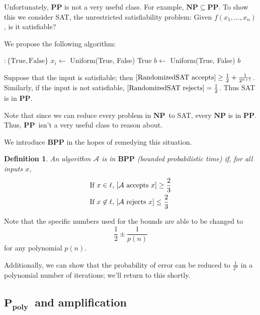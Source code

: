 \documentclass[11pt]{article}
\let\Pr\relax
\DeclareMathOperator*{\Pr}{\mathbb{P}}
\newcommand{\NP}{\ensuremath{\mathbf{NP}}}
\newcommand{\PP}{\ensuremath{\mathbf{PP}}}
\newcommand{\BPP}{\ensuremath{\mathbf{BPP}}}
\newcommand{\Ppoly}{\ensuremath{\mathbf{P_{poly}}}}
\newcommand{\Alg}{\ensuremath{\mathcal{A}}}
\newtheorem{definition}[theorem]{Definition}
\begin{document}
Unfortunately, $\PP$ is not a very useful class. For example, $\NP\subseteq\PP$. To show this we consider SAT, the unrestricted satisfiability problem: Given $f(x_1, \dots, x_n)$, is it satisfiable?

We propose the following algorithm:

\begin{algorithm}[H]
\begin{algorithmic}
$: \{\mathrm{True},\mathrm{False}\}$
    \State $x_i \gets $ Uniform(True, False)
  \EndFor
    \State \Return True
  \Else
    \State $b \gets $ Uniform(True, False)
    \State \Return $b$
  \EndIf
\EndFunction
\end{algorithmic}
\end{algorithm}

Suppose that the input is satisfiable; then $\Pr[\text{RandomizedSAT accepts}] \geq \frac{1}{2} + \frac{1}{2^{n+1}}$.
Similarly, if the input is not satisfiable, $\Pr[\text{RandomizedSAT rejects}] = \frac12$.  Thus SAT is in \PP.

Note that since we can reduce every problem in \NP\ to SAT, every $\NP$ is in \PP. Thus, \PP\ isn't a very useful class to reason about.

We introduce $\BPP$ in the hopes of remedying this situation.
\begin{definition}
An algorithm $\Alg$ is in $\BPP$ (bounded probabilistic time) if, for all inputs $x$,
\begin{align*}
  &\text{If $x \in \ell$, $\Pr[\Alg \text{ accepts } x] \ge \frac23$} \\
  &\text{If $x \not\in \ell$, $\Pr[\Alg \text{ rejects } x] \le \frac23$}
\end{align*}
\end{definition}


Note that the specific numbers used for the bounds are able to be changed to
$$\frac{1}{2} \pm \frac{1}{p(n)}$$
for any polynomial $p(n)$.

Additionally, we can show that the probability of error can be reduced to $\frac{1}{2^n}$ in a polynomial number of iterations; we'll return to this shortly.

\subsection{\Ppoly\ and amplification}
\end{document}
